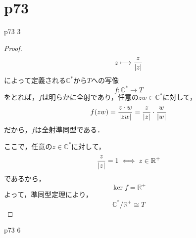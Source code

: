 \documentclass[dvipdfmx,uplatex,11pt]{jsarticle}
\DeclarePairedDelimiter\abs{\lvert}{\rvert}
\theoremstyle{mytheorem}
\begin{document}
        \section{p73}
        p73 3
        \begin{leftbar}
            \begin{proof}
                \[
                z \longmapsto \frac{z}{\abs{z}}
                \]
                によって定義される$\mathbb{C}^{\ast}$から$T$への写像
                \[
                f \colon \mathbb{C}^{\ast} \longrightarrow T
                \]
                をとれば，$f$は明らかに全射であり，任意の$zw \in \mathbb{C}^{\ast}$に対して，
                \[
                    f(zw)= \frac{z \cdot w}{\abs{zw}}= \frac{z}{\abs{z}} \cdot \frac{w}{\abs{w}}
                \]
                だから，$f$は全射準同型である．

                ここで，任意の$z \in \mathbb{C}^{\ast}$に対して，
                \[
                    \frac{z}{\abs{z}}=1 \iff z \in \mathbb{R}^{+}
                \]
                であるから，
                \[
                    \ker f = \mathbb{R}^{+}
                \]
                よって，準同型定理により，
                \[
                    \mathbb{C}^{\ast} / \mathbb{R}^{+} \cong T
                \]
            \end{proof}
        \end{leftbar}
        \newpage
        p73 6
\end{document}
